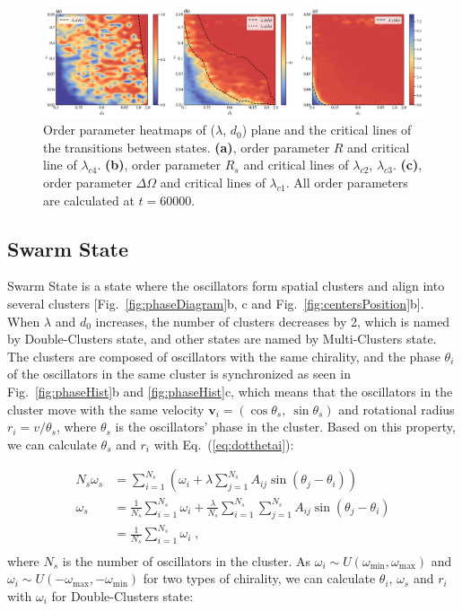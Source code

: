 \documentclass[%
 aip,
 amsmath,amssymb,
 reprint,%
]{revtex4-1}
\begin{document}
\begin{figure}
    \includegraphics[width=\textwidth]{./figs/orderParam.png}
    \caption{
        \label{fig:orderParam} Order parameter heatmaps of ($\lambda$, $d_0$) plane and the critical lines of the transitions between states.
        \textbf{(a)}, order parameter $R$ and critical line of $\lambda_{c4}$.
        \textbf{(b)}, order parameter $R_s$ and critical lines of $\lambda_{c2}$, $\lambda_{c3}$.
        \textbf{(c)}, order parameter $\Delta \Omega$ and critical lines of $\lambda_{c1}$.
        All order parameters are calculated at $t=60000$.
    }
\end{figure}

\subsection{Swarm State}

Swarm State is a state where the oscillators form spatial clusters and align into several clusters [Fig.~\ref{fig:phaseDiagram}b, c and Fig.~\ref{fig:centersPosition}b]. When $\lambda$ and $d_0$ increases, the number of clusters decreases by 2, which is named by Double-Clusters state, and other states are named by Multi-Clusters state. The clusters are composed of oscillators with the same chirality, and the phase $\theta_i$ of the oscillators in the same cluster is synchronized as seen in Fig.~\ref{fig:phaseHist}b and \ref{fig:phaseHist}c, which means that the oscillators in the cluster move with the same velocity $\mathbf{v}_i=\left( \cos \theta _s,\ \sin \theta _s \right)$ and rotational radius $r_i=v/\theta_s$, where $\theta_s$ is the oscillators' phase in the cluster. Based on this property, we can calculate $\theta_s$ and $r_i$ with Eq.~(\ref{eq:dotthetai}):

\begin{equation}\label{eq:clusterState}
    \begin{aligned}
        N_s\omega _s&=\sum_{i=1}^{N_s}{\left( \omega _i+\lambda \sum_{j=1}^{N_s}{A_{ij}\sin \left( \theta _j-\theta _i \right)} \right)}\\
        \omega _s&=\frac{1}{N_s}\sum_{i=1}^{N_s}{\omega _i}+\frac{\lambda}{N_s}\sum_{i=1}^{N_s}{\sum_{j=1}^{N_s}{A_{ij}\sin \left( \theta _j-\theta _i \right)}}\\
        &=\frac{1}{N_s}\sum_{i=1}^{N_s}{\omega _i}\;,\\
    \end{aligned}
\end{equation}
where $N_s$ is the number of oscillators in the cluster.
As $\omega_i \sim U\left( \omega _{\min},\omega _{\max} \right)$ and $\omega_i \sim U\left( -\omega _{\max},-\omega _{\min} \right)$ for two types of chirality, we can calculate $\theta_i$, $\omega_s$ and $r_i$ with $\omega_i$ for Double-Clusters state:
\end{document}
